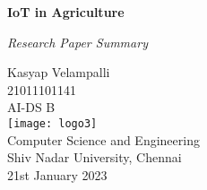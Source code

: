 \begin{titlepage}
    \centering
        \vspace*{2cm}
        \Huge
        \textbf{IoT in Agriculture}
        
        \vspace*{0.6cm}
        \Large
        \textit{Research Paper Summary}
        
        \normalsize
        \vspace*{1.5cm}
        Kasyap Velampalli\\
        \vspace{0.2cm}
        21011101141\\
        \vspace{0.2cm}
        AI-DS B\\
        
        
        \texttt{[image: logo3]}\\
        Computer Science and Engineering\\
        Shiv Nadar University, Chennai\\
        21st January 2023
        \vspace*{1cm}
    
\end{titlepage}
